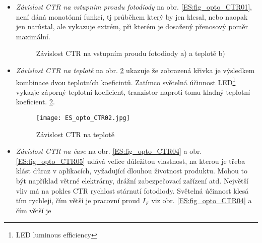         \begin{itemize}
          \item \emph{Závislost CTR na vstupním proudu fotodiody} na obr. \ref{ES:fig_opto_CTR01},
                není dáná monotónní funkcí, tj průběhem který by jen klesal, nebo naopak jen
                narůstal, ale vykazuje extrém, při kterém je dosažený přenosový poměr maximální.
                \begin{figure}[ht!]
                  \centering
                      {}   \newline
                      {}
                  \caption{Závislost CTR na vstupním proudu fotodiody a) a teplotě b)}
                  \label{ES:fig_opto_CTRparam}
                \end{figure}
          \item \emph{Závislost CTR na teplotě} na obr. \ref{ES:fig_opto_CTR02} ukazuje že
                zobrazená křivka je výsledkem kombinace dvou teplotních koeficintů. Zatímco
                světelná účinnost LED\footnote{LED luminous efficiency} vykazje záporný teplotní
                koeficient, tranzistor naproti tomu kladný teplotní koeficient.
                \ref{ES:fig_opto_CTR02}. 
                \begin{figure}[ht!]
                  \centering
                  \texttt{[image: ES\_opto\_CTR02.jpg]}
                  \caption{Závislost CTR na teplotě}
                  \label{ES:fig_opto_CTR02}
                \end{figure}
          \item \emph{Závislost CTR na čase} na obr. \ref{ES:fig_opto_CTR04} a obr.
                \ref{ES:fig_opto_CTR05} udává velice důležitou vlastnost, na kterou je třeba klást
                důraz v aplikacích, vyžadující dlouhou životnost produktu. Mohou to být
                například větrné elektrárny, drážní zabezpečovací zařízení atd. Největší vliv má na
                pokles CTR rychlost stárnutí fotodiody. Světelná účinnost klesá tím rychleji, čím
                větší je pracovní proud \(I_F\) viz obr. \ref{ES:fig_opto_CTR04} a čím větší je

\end{itemize}
